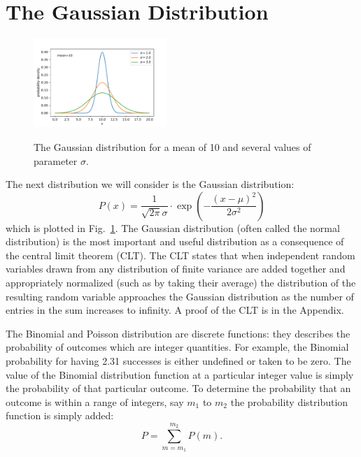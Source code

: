 \documentclass[12pt,oneside]{book}
\begin{document}
\section{The Gaussian Distribution}

\begin{figure}[htbp]
\begin{center}
{\includegraphics[width=0.45\textwidth]{figs/gaussian.pdf}}
\end{center}
\caption{\label{fig:gaussian}  The Gaussian distribution for a mean of 10 and several values of parameter $\sigma$.}
\end{figure}

The next distribution we will consider is the Gaussian distribution:
\begin{equation}
\label{eqn:gaussian}
P(x) = \frac{1}{\sqrt{2\pi} \sigma} \cdot \exp\left( - \frac{(x - \mu)^2}{2 \sigma^2}\right)
\end{equation}
which is plotted in Fig.~\ref{fig:gaussian}.  The Gaussian
distribution (often called the normal distribution) is the most
important and useful distribution as a consequence of the central
limit theorem (CLT).  The CLT states that when independent random
variables drawn from any distribution of finite variance are added
together and appropriately normalized (such as by taking their
average) the distribution of the resulting random variable approaches
the Gaussian distribution as the number of entries in the sum
increases to infinity.  A proof of the CLT is in the Appendix.

The Binomial and Poisson distribution are discrete functions: they
describes the probability of outcomes which are integer quantities.
For example, the Binomial probability for having 2.31 successes is
either undefined or taken to be zero.  The value of the
Binomial distribution function at a particular integer value is simply
the probability of that particular outcome.  To determine the
probability that an outcome is within a range of integers, say $m_1$
to $m_2$ the probability distribution function is simply added:
\begin{displaymath}
P = \sum_{m=m_1}^{m_2} P(m).
\end{displaymath}
\end{document}
